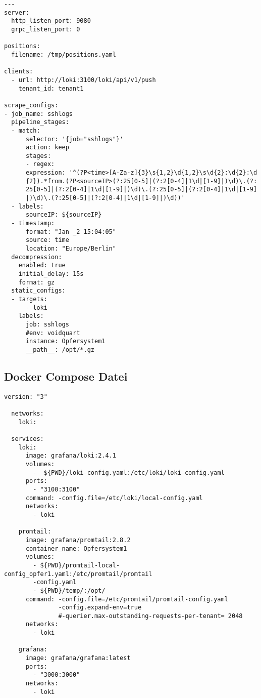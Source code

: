{
\begin{Verbatim}[frame=single,fontsize=\small]
---
server:
  http_listen_port: 9080
  grpc_listen_port: 0

positions:
  filename: /tmp/positions.yaml

clients:
  - url: http://loki:3100/loki/api/v1/push
    tenant_id: tenant1

scrape_configs:
- job_name: sshlogs
  pipeline_stages:
  - match:
      selector: '{job="sshlogs"}'
      action: keep
      stages:
      - regex:
      expression: '^(?P<time>[A-Za-z]{3}\s{1,2}\d{1,2}\s\d{2}:\d{2}:\d
      {2}).*from.(?P<sourceIP>(?:25[0-5]|(?:2[0-4]|1\d|[1-9]|)\d)\.(?:
      25[0-5]|(?:2[0-4]|1\d|[1-9]|)\d)\.(?:25[0-5]|(?:2[0-4]|1\d|[1-9]
      |)\d)\.(?:25[0-5]|(?:2[0-4]|1\d|[1-9]|)\d))'
  - labels:
      sourceIP: ${sourceIP}
  - timestamp:
      format: "Jan _2 15:04:05"
      source: time
      location: "Europe/Berlin"
  decompression:
    enabled: true
    initial_delay: 15s
    format: gz
  static_configs:
  - targets:
      - loki
    labels:
      job: sshlogs
      #env: voidquart
      instance: Opfersystem1
      __path__: /opt/*.gz
\end{Verbatim}
}

\newpage
\subsection{Docker Compose Datei}

{
\begin{Verbatim}[frame=single,fontsize=\small]
  version: "3"

  networks:
    loki:
  
  services:
    loki:
      image: grafana/loki:2.4.1
      volumes:
        -  ${PWD}/loki-config.yaml:/etc/loki/loki-config.yaml
      ports:
        - "3100:3100"
      command: -config.file=/etc/loki/local-config.yaml
      networks:
        - loki
  
    promtail:
      image: grafana/promtail:2.8.2
      container_name: Opfersystem1
      volumes:
        - ${PWD}/promtail-local-config_opfer1.yaml:/etc/promtail/promtail
        -config.yaml
        - ${PWD}/temp/:/opt/
      command: -config.file=/etc/promtail/promtail-config.yaml 
               -config.expand-env=true 
               #-querier.max-outstanding-requests-per-tenant= 2048
      networks:
        - loki
  
    grafana:
      image: grafana/grafana:latest
      ports:
        - "3000:3000"
      networks:
        - loki  
\end{Verbatim}
}